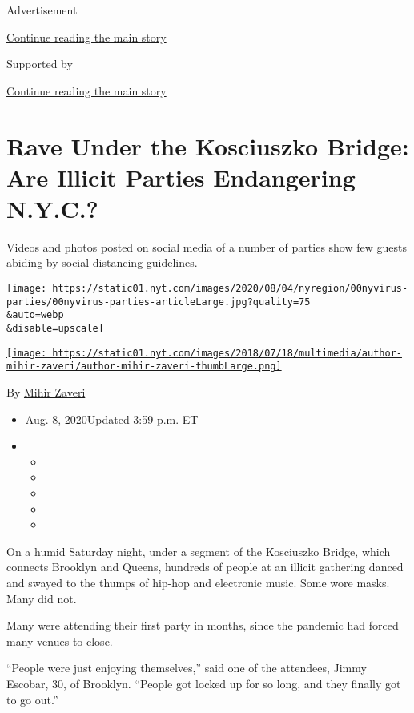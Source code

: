 Advertisement

\protect\hyperlink{after-top}{Continue reading the main story}

Supported by

\protect\hyperlink{after-sponsor}{Continue reading the main story}

\hypertarget{rave-under-the-kosciuszko-bridge-are-illicit-parties-endangering-nyc}{%
\section{Rave Under the Kosciuszko Bridge: Are Illicit Parties
Endangering
N.Y.C.?}\label{rave-under-the-kosciuszko-bridge-are-illicit-parties-endangering-nyc}}

Videos and photos posted on social media of a number of parties show few
guests abiding by social-distancing guidelines.

\texttt{[image: https://static01.nyt.com/images/2020/08/04/nyregion/00nyvirus-parties/00nyvirus-parties-articleLarge.jpg?quality=75\\\&auto=webp\\\&disable=upscale]}

\href{https://www.nytimes.com/by/mihir-zaveri}{\texttt{[image: https://static01.nyt.com/images/2018/07/18/multimedia/author-mihir-zaveri/author-mihir-zaveri-thumbLarge.png]}}

By \href{https://www.nytimes.com/by/mihir-zaveri}{Mihir Zaveri}

\begin{itemize}
\item
  Aug. 8, 2020Updated 3:59 p.m. ET
\item
  \begin{itemize}
  \item
  \item
  \item
  \item
  \item
  \end{itemize}
\end{itemize}

On a humid Saturday night, under a segment of the Kosciuszko Bridge,
which connects Brooklyn and Queens, hundreds of people at an illicit
gathering danced and swayed to the thumps of hip-hop and electronic
music. Some wore masks. Many did not.

Many were attending their first party in months, since the pandemic had
forced many venues to close.

``People were just enjoying themselves,'' said one of the attendees,
Jimmy Escobar, 30, of Brooklyn. ``People got locked up for so long, and
they finally got to go out.''

